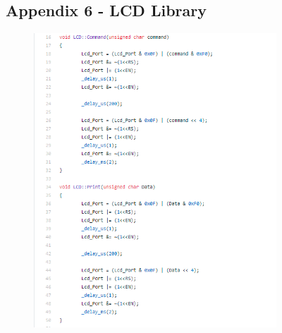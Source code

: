\documentclass[11pt]{article}
\begin{document}
\begin{figure}
\subsection{Appendix 6 - LCD Library}
    \begin{subfigure}{\textwidth}
    \centering
    \includegraphics[width=1\textwidth]{Images/LCD_Lib_1.png}
    \end{subfigure}
\end{figure}
\end{document}
